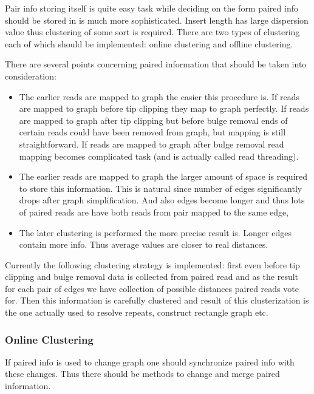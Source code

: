 \documentclass[12pt]{article}
\begin{document}
Pair info storing itself is quite easy task while deciding on the form paired info should be stored in is much more sophisticated. Insert length has large dispersion value thus clustering of some sort is required. There are two types of clustering each of which should be implemented: online clustering and offline clustering.

There are several points concerning paired information that should be taken into consideration:

\begin{itemize}
\item The earlier reads are mapped to graph the easier this procedure is. If reads are mapped to graph before tip clipping they map to graph perfectly. If reads are mapped to graph after tip clipping but before bulge removal ends of certain reads could have been removed from graph, but mapping is still straightforward. If reads are mapped to graph after bulge removal read mapping becomes complicated task (and is actually called read threading).

\item The earlier reads are mapped to graph the larger amount of space is required to store this information. This is natural since number of edges significantly drops after graph simplification. And also edges become longer and thus lots of paired reads are have both reads from pair mapped to the same edge,

\item The later clustering is performed the more precise result is. Longer edges contain more info. Thus average values are closer to real distances.
\end{itemize}

Currently the following clustering strategy is implemented: first even before tip clipping and bulge removal data is collected from paired read and as the result for each pair of edges we have collection of possible distances paired reads vote for. Then this information is carefully clustered and result of this clusterization is the one actually used to resolve repeats, construct rectangle graph etc.

\subsubsection{Online Clustering}

If paired info is used to change graph one should synchronize paired info with these changes. Thus there should be methods to change and merge paired information.
\end{document}
